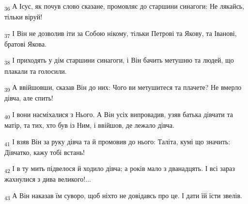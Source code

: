 \begin{tcolorbox}
\textsubscript{36} А Ісус, як почув слово сказане, промовляє до старшини синагоги: Не лякайсь, тільки віруй!
\end{tcolorbox}
\begin{tcolorbox}
\textsubscript{37} І Він не дозволив іти за Собою нікому, тільки Петрові та Якову, та Іванові, братові Якова.
\end{tcolorbox}
\begin{tcolorbox}
\textsubscript{38} І приходять у дім старшини синагоги, і Він бачить метушню та людей, що плакали та голосили.
\end{tcolorbox}
\begin{tcolorbox}
\textsubscript{39} А ввійшовши, сказав Він до них: Чого ви метушитеся та плачете? Не вмерло дівча, але спить!
\end{tcolorbox}
\begin{tcolorbox}
\textsubscript{40} І вони насміхалися з Нього. А Він усіх випровадив, узяв батька дівчати та матір, та тих, хто був із Ним, і ввійшов, де лежало дівча.
\end{tcolorbox}
\begin{tcolorbox}
\textsubscript{41} І взяв Він за руку дівча та й промовив до нього: Таліта, кумі що значить: Дівчатко, кажу тобі встань!
\end{tcolorbox}
\begin{tcolorbox}
\textsubscript{42} І в ту мить підвелося й ходило дівча; а років мало з дванадцять. І всі зараз жахнулися з дива великого!...
\end{tcolorbox}
\begin{tcolorbox}
\textsubscript{43} А Він наказав їм суворо, щоб ніхто не довідавсь про це. І дати їй їсти звелів.
\end{tcolorbox}
